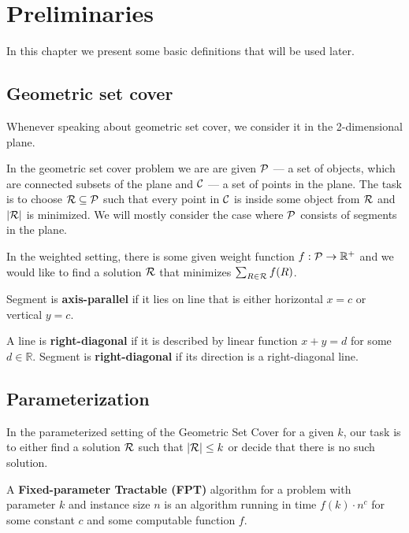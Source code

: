 \chapter{Preliminaries}

In this chapter we present some basic definitions that
will be used later.

\section{Geometric set cover}
\label{section:def:geometric__set_cover}
Whenever speaking about geometric set cover,
we consider it in the 2-dimensional plane.

In the geometric set cover problem we are are given
$\mathcal{P}$ --- a set of objects, which are connected
subsets of the plane and $\mathcal{C}$ --- a set of points in the plane.
The task is to choose $\mathcal{R} \subseteq \mathcal{P}$ such that
every point in $\mathcal{C}$ is inside some object from $\mathcal{R}$
and $|\mathcal{R}|$ is minimized. We will mostly consider the case where
$\mathcal{P}$ consists of segments in the plane.

In the weighted setting, there is some given weight function
$f : \mathcal{P} \rightarrow \mathbb{R^+}$
and we would like to find a solution $\mathcal{R}$
that minimizes $\sum_{R \in \mathcal{R}} f(R)$.

\begin{defi}
Segment is \textbf{axis-parallel} if it lies on line that is
either horizontal $x = c$ or vertical $y = c$.
\end{defi}

\begin{defi}
	A line is \textbf{right-diagonal} if it is
	described by linear function $x + y = d$ for some $d \in \mathbb{R}$.
	Segment is \textbf{right-diagonal} if its
	direction is a right-diagonal line.
\end{defi}

\section{Parameterization}

In the parameterized setting of the Geometric Set Cover
for a given $k$,
our task is to either find a solution $\mathcal{R}$ such that $|\mathcal{R}| \le k$
or decide that there is no such solution.

\begin{defi}
A \textbf{Fixed-parameter Tractable (FPT)} algorithm 
for a problem with parameter $k$ and instance size $n$
is an algorithm running in time $f(k) \cdot n^c$
for some constant $c$ and some computable function $f$.
\end{defi}

